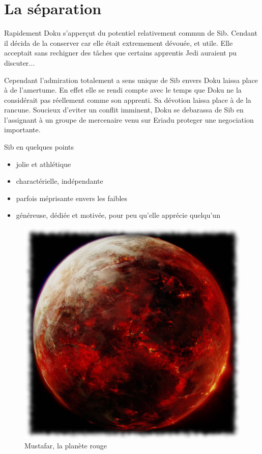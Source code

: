 \documentclass[10pt,a4paper,twoside,twocolumn,openany]{book}
\begin{document}
\section{La séparation}
Rapidement Doku s'apperçut du potentiel relativement commun de Sib. Cendant il décida de la conserver car elle était extremement dévouée, et utile. Elle acceptait sans rechigner des tâches que certains apprentis Jedi auraient pu discuter...

Cependant l'admiration totalement a sens unique de Sib envers Doku laissa
place à de l'amertume. En effet elle se rendi compte avec le temps que Doku
 ne la considérait pas réellement comme son apprenti.
Sa dévotion laissa place à de la rancune. Soucieux d'eviter un conflit imminent, Doku se debarassa de Sib en
l'assignant à un groupe de mercenaire venu sur Eriadu proteger une negociation importante.

\begin{commentbox}{Sib en quelques points}

\begin{itemize}
\item jolie et athlétique
\item charactérielle, indépendante
\item parfois méprisante envers les faibles
\item généreuse, dédiée et motivée, pour peu qu'elle apprécie quelqu'un
\end{itemize}

\end{commentbox}

\vspace{2cm}

\begin{figure}
\centering
\includegraphics[scale=0.4]{mustafar.png}
\caption*{Mustafar, la planète rouge}
\end{figure}
\end{document}
